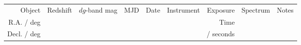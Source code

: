 \documentclass[a4paper,fleqn,usenatbib]{mnras}
\begin{document}
\begin{table*}
 \centering
 \begin{tabular}{r  r  r r r   r r r r}
  \hline \hline 
   Object                         & \multirow{3}{*}{Redshift} & \multirow{3}{*}{$dg$-band mag}      & \multirow{3}{*}{MJD} & \multirow{3}{*}{Date}  & \multirow{3}{*}{Instrument}   & Exposure    & \multirow{3}{*}{Spectrum} & \multirow{3}{*}{Notes} \\
   R.A. / deg                   &               &               &            &                                &                                                                       &  Time         & & \\
   Decl. / deg                 &               &               &            &                                &                                                                       &  / seconds         & & \\


\end{tabular}
\end{table*}
\end{document}
